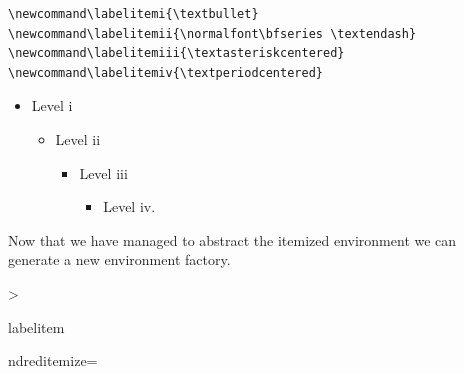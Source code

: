 \bigskip
\begin{tcolorbox}[width=\linewidth,arc=2mm,title=Default \LaTeX\ parameters for itemized lists]
\begin{lstlisting}
\newcommand\labelitemi{\textbullet}
\newcommand\labelitemii{\normalfont\bfseries \textendash}
\newcommand\labelitemiii{\textasteriskcentered}
\newcommand\labelitemiv{\textperiodcentered}
\end{lstlisting}
\end{tcolorbox}





\begin{itemize}
\item Level i
      \begin{itemize}
       \item Level ii
          \begin{itemize}
            \item Level iii
              \begin{itemize}
                \item Level iv. \lipsum*[1]
              \end{itemize}
          \end{itemize}
      \end{itemize}
\end{itemize}


Now that we have managed to abstract the itemized environment we can generate a new environment factory.

\def\newitemizedenvironment#1#2{
\expandafter\def\csname#1\endcsname{%
 \cxset{#2}%
 \ifnum \@itemdepth >\thr@@\@toodeep\else
 \advance\@itemdepth\@ne
 \edef\@itemitem{labelitem\romannumeral\the\@itemdepth}%
 \expandafter
 \list
 \csname\@itemitem\endcsname
 {\def\makelabel####1{\hss\llap{####1}}}%
 \fi}
 \expandafter\let\csname end#1\endcsname=\endlist
}

\newitemizedenvironment{reditemize}{red}


